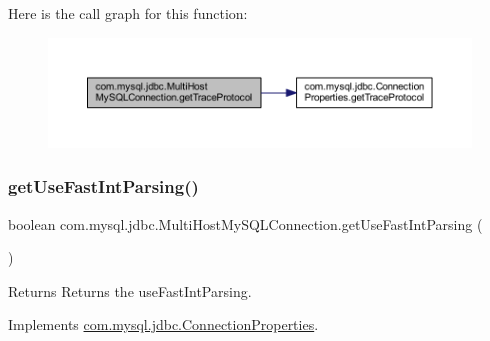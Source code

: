 Here is the call graph for this function\+:
\nopagebreak
\begin{figure}[H]
\begin{center}
\leavevmode
\includegraphics[width=350pt]{classcom_1_1mysql_1_1jdbc_1_1_multi_host_my_s_q_l_connection_ac04f24be8ad62148eb1ea1718ea42851_cgraph}
\end{center}
\end{figure}
\mbox{\label{classcom_1_1mysql_1_1jdbc_1_1_multi_host_my_s_q_l_connection_ac96f1a2219ce5549d6d205687484734e}} 
\subsubsection{\texorpdfstring{get\+Use\+Fast\+Int\+Parsing()}{getUseFastIntParsing()}}
{\footnotesize\ttfamily boolean com.\+mysql.\+jdbc.\+Multi\+Host\+My\+S\+Q\+L\+Connection.\+get\+Use\+Fast\+Int\+Parsing (\begin{DoxyParamCaption}{ }\end{DoxyParamCaption})}

\begin{DoxyReturn}{Returns}
Returns the use\+Fast\+Int\+Parsing. 
\end{DoxyReturn}


Implements \mbox{\hyperlink{interfacecom_1_1mysql_1_1jdbc_1_1_connection_properties_af48fc4f6629e4ada4cf9bc8668207e1c}{com.\+mysql.\+jdbc.\+Connection\+Properties}}.

